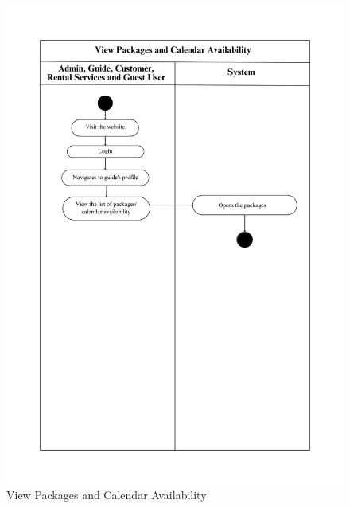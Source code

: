 \begin{figure}[h]
    \centering
    \includegraphics[width=1\textwidth]{Images/Activity Diagrams/17 View Packages and Calendar Availability.png}
    \caption{View Packages and Calendar Availability}
    \label{fig:activity-view-packages}
\end{figure}

